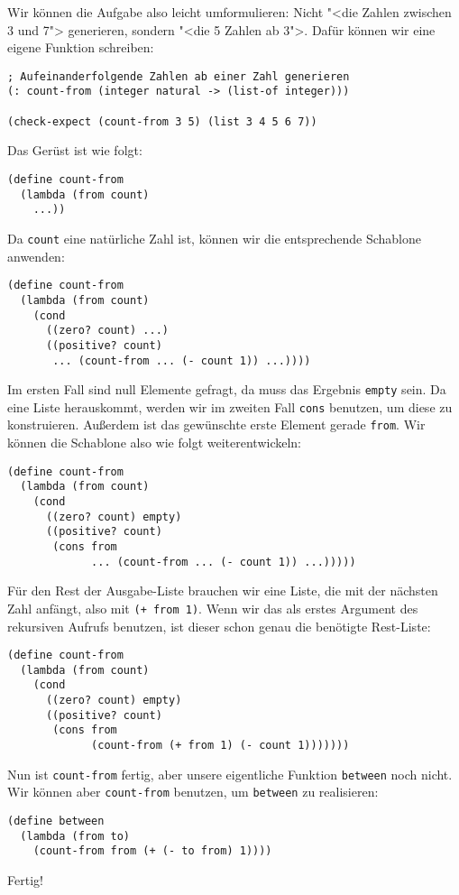 Wir können die Aufgabe also leicht umformulieren: Nicht "<die Zahlen
zwischen 3 und 7"> generieren, sondern "<die 5 Zahlen ab 3">.  Dafür
können wir eine eigene Funktion schreiben:
%
\begin{lstlisting}
; Aufeinanderfolgende Zahlen ab einer Zahl generieren
(: count-from (integer natural -> (list-of integer)))

(check-expect (count-from 3 5) (list 3 4 5 6 7))
\end{lstlisting}
%
Das Gerüst ist wie folgt:
%
\begin{lstlisting}
(define count-from
  (lambda (from count)
    ...))
\end{lstlisting}
%
Da \lstinline{count} eine natürliche Zahl ist, können wir die
entsprechende Schablone anwenden:
%
\begin{lstlisting}
(define count-from
  (lambda (from count)
    (cond
      ((zero? count) ...)
      ((positive? count)
       ... (count-from ... (- count 1)) ...))))
\end{lstlisting}
%
Im ersten Fall sind null Elemente gefragt, da muss das Ergebnis
\lstinline{empty} sein.  Da eine Liste herauskommt, werden wir
im zweiten Fall \lstinline{cons} benutzen, um diese zu
konstruieren.  Außerdem ist das gewünschte erste Element gerade
\lstinline{from}.  Wir können die Schablone also wie folgt
weiterentwickeln:
%
\begin{lstlisting}
(define count-from
  (lambda (from count)
    (cond
      ((zero? count) empty)
      ((positive? count)
       (cons from
             ... (count-from ... (- count 1)) ...)))))
\end{lstlisting}
%
Für den Rest der Ausgabe-Liste brauchen wir eine Liste, die mit der
nächsten Zahl anfängt, also mit \lstinline{(+ from 1)}.  Wenn wir das
als erstes Argument des rekursiven Aufrufs benutzen, ist dieser schon
genau die benötigte Rest-Liste:
%
\begin{lstlisting}
(define count-from
  (lambda (from count)
    (cond
      ((zero? count) empty)
      ((positive? count)
       (cons from
             (count-from (+ from 1) (- count 1)))))))
\end{lstlisting}
%
Nun ist \lstinline{count-from} fertig, aber unsere eigentliche Funktion
\lstinline{between} noch nicht.  Wir können aber \lstinline{count-from}
benutzen, um \lstinline{between} zu realisieren:
%
\begin{lstlisting}
(define between
  (lambda (from to)
    (count-from from (+ (- to from) 1))))
\end{lstlisting}
%
Fertig!

